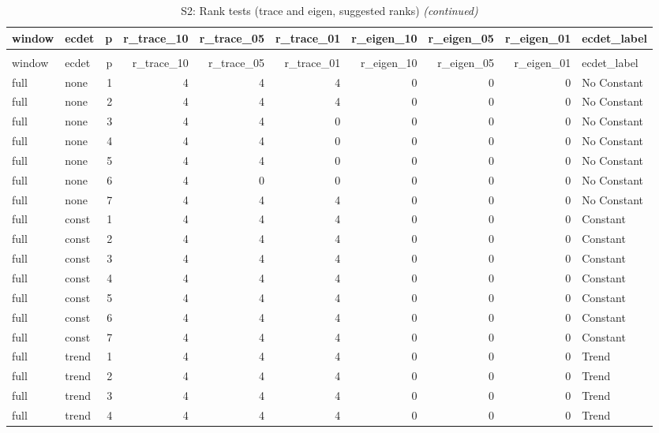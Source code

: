 \begingroup\fontsize{9}{11}\selectfont

\begin{longtable}[t]{llrrrrrrrl}
\caption{\label{tab:tab:S2_rank_all}S2: Rank tests (trace and eigen, suggested ranks)}\\
\toprule
window & ecdet & p & r\_trace\_10 & r\_trace\_05 & r\_trace\_01 & r\_eigen\_10 & r\_eigen\_05 & r\_eigen\_01 & ecdet\_label\\
\midrule
\endfirsthead
\caption[]{S2: Rank tests (trace and eigen, suggested ranks) \textit{(continued)}}\\
\toprule
window & ecdet & p & r\_trace\_10 & r\_trace\_05 & r\_trace\_01 & r\_eigen\_10 & r\_eigen\_05 & r\_eigen\_01 & ecdet\_label\\
\midrule
\endhead

\endfoot
\bottomrule
\endlastfoot
full & none & 1 & 4 & 4 & 4 & 0 & 0 & 0 & No Constant\\
full & none & 2 & 4 & 4 & 4 & 0 & 0 & 0 & No Constant\\
full & none & 3 & 4 & 4 & 0 & 0 & 0 & 0 & No Constant\\
full & none & 4 & 4 & 4 & 0 & 0 & 0 & 0 & No Constant\\
full & none & 5 & 4 & 4 & 0 & 0 & 0 & 0 & No Constant\\
\addlinespace
full & none & 6 & 4 & 0 & 0 & 0 & 0 & 0 & No Constant\\
full & none & 7 & 4 & 4 & 4 & 0 & 0 & 0 & No Constant\\
full & const & 1 & 4 & 4 & 4 & 0 & 0 & 0 & Constant\\
full & const & 2 & 4 & 4 & 4 & 0 & 0 & 0 & Constant\\
full & const & 3 & 4 & 4 & 4 & 0 & 0 & 0 & Constant\\
\addlinespace
full & const & 4 & 4 & 4 & 4 & 0 & 0 & 0 & Constant\\
full & const & 5 & 4 & 4 & 4 & 0 & 0 & 0 & Constant\\
full & const & 6 & 4 & 4 & 4 & 0 & 0 & 0 & Constant\\
full & const & 7 & 4 & 4 & 4 & 0 & 0 & 0 & Constant\\
full & trend & 1 & 4 & 4 & 4 & 0 & 0 & 0 & Trend\\
\addlinespace
full & trend & 2 & 4 & 4 & 4 & 0 & 0 & 0 & Trend\\
full & trend & 3 & 4 & 4 & 4 & 0 & 0 & 0 & Trend\\
full & trend & 4 & 4 & 4 & 4 & 0 & 0 & 0 & Trend\\

\end{longtable}
